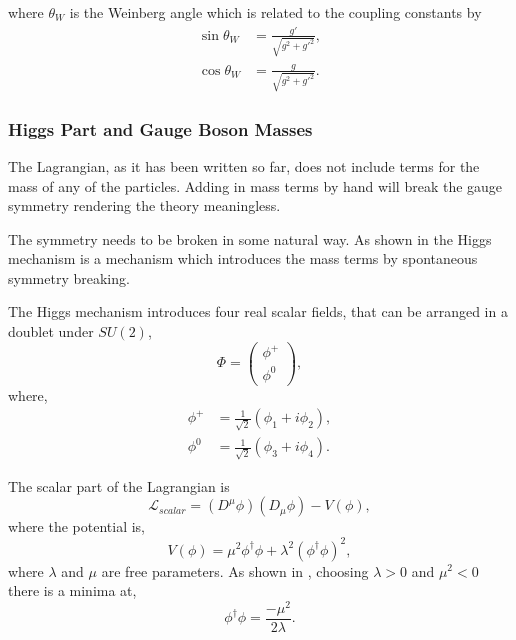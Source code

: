 where $\theta_{W}$ is the Weinberg angle which is related to the coupling
constants by
\begin{align*}
\sin\theta_{W} &= \frac{g\prime}{\sqrt{g^{2}+g\prime^{2}}},\\
\cos\theta_{W} &= \frac{g}{\sqrt{g^{2}+g\prime^{2}}}.
\end{align*}

\subsubsection{Higgs Part and Gauge Boson Masses}

The Lagrangian, as it has been written so far, does not include terms for the
mass of any of the particles. 
Adding in mass terms by hand will break the
gauge symmetry rendering the theory meaningless.

The symmetry needs to be broken in some natural way.
As shown in  
the Higgs mechanism is a mechanism which introduces the mass terms by
spontaneous symmetry breaking.

The Higgs mechanism introduces four real scalar fields, that can be arranged in a
doublet under $SU(2)$,
\begin{equation}
\Phi = \left( \begin{matrix} \phi^{+} \\ \phi^{0} \end{matrix} \right),
\end{equation}
where,
\begin{align*}
\phi^{+} &=\frac{1}{\sqrt{2}} (\phi_{1} + i \phi_{2}),\\
\phi^{0} &=\frac{1}{\sqrt{2}} (\phi_{3} + i \phi_{4}).
\end{align*}

The scalar part of the Lagrangian is
\begin{equation}
\mathcal{L}_{scalar} = 
\left(D^{\mu}\phi\right) \left(D_{\mu}\phi\right) - V(\phi),
\end{equation}
where the potential is,
\begin{equation}
V(\phi) = 
\mu^{2}\phi^{\dagger}\phi + 
\lambda^{2} \left( \phi^{\dagger} \phi \right)^{2},
\end{equation}
where $\lambda$ and $\mu$ are free parameters. As shown in , choosing  $\lambda>0$ and
$\mu^{2}<0$ there is a minima at,
\begin{equation}
\phi^{\dagger} \phi = \frac{- \mu^{2}}{2 \lambda}.
\end{equation}


